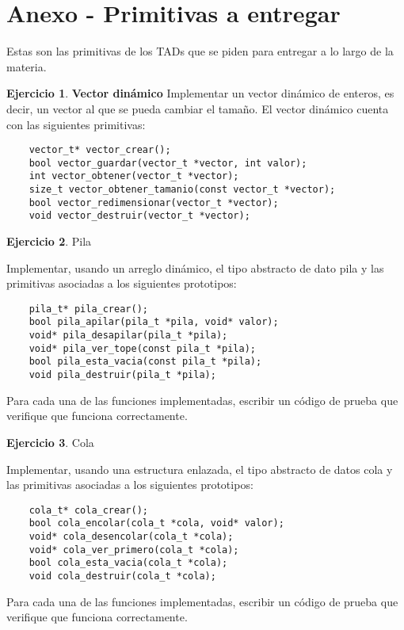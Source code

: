 \documentclass[11pt,a4paper]{article}
\theoremstyle{definition}
\newtheorem{ejercicio}{Ejercicio}[section]
\begin{document}
\newpage
\section{Anexo - Primitivas a entregar}
Estas son las primitivas de los TADs que se piden para entregar a lo largo
de la materia.

\begin{ejercicio}
\textbf{Vector dinámico} Implementar un vector dinámico de enteros, es
decir, un vector al que se pueda cambiar el tamaño.  El vector dinámico
cuenta con las siguientes primitivas:

\begin{lstlisting}
    vector_t* vector_crear();
    bool vector_guardar(vector_t *vector, int valor);
    int vector_obtener(vector_t *vector);
    size_t vector_obtener_tamanio(const vector_t *vector);
    bool vector_redimensionar(vector_t *vector);
    void vector_destruir(vector_t *vector);
\end{lstlisting}
\end{ejercicio}

\begin{ejercicio}
Pila
\begin{partes}
\item Implementar, usando un arreglo dinámico, el tipo abstracto de dato
pila y las primitivas asociadas a los siguientes prototipos:
\begin{lstlisting}
    pila_t* pila_crear();
    bool pila_apilar(pila_t *pila, void* valor);
    void* pila_desapilar(pila_t *pila);
    void* pila_ver_tope(const pila_t *pila);
    bool pila_esta_vacia(const pila_t *pila);
    void pila_destruir(pila_t *pila);
\end{lstlisting}
\item Para cada una de las funciones implementadas, escribir un código de
prueba que verifique que funciona correctamente.
\end{partes}
\end{ejercicio}

\begin{ejercicio}
Cola
\begin{partes}
\item Implementar, usando una estructura enlazada, el tipo abstracto de
datos cola y las primitivas asociadas a los siguientes prototipos:
\begin{lstlisting}
    cola_t* cola_crear();
    bool cola_encolar(cola_t *cola, void* valor);
    void* cola_desencolar(cola_t *cola);
    void* cola_ver_primero(cola_t *cola);
    bool cola_esta_vacia(cola_t *cola);
    void cola_destruir(cola_t *cola);
\end{lstlisting}
\item Para cada una de las funciones implementadas, escribir un código de
prueba que verifique que funciona correctamente.
\end{partes}
\end{ejercicio}
\end{document}
